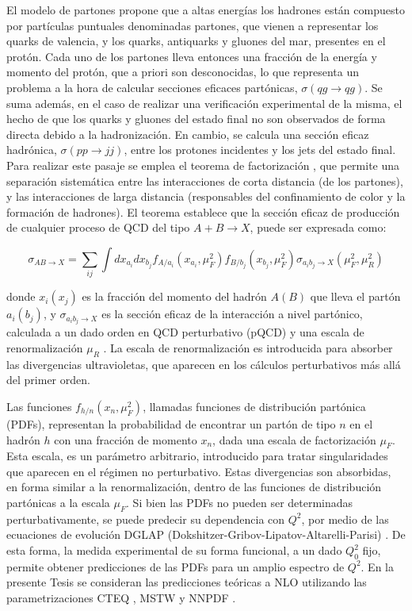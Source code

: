 El modelo de partones propone que a altas energías los hadrones están compuesto por partículas puntuales denominadas partones, que vienen a representar los quarks de valencia, y los quarks, antiquarks y gluones del mar, presentes en el protón. Cada uno de los partones lleva entonces una fracción de la energía y momento del protón, que a priori son desconocidas, lo que representa un problema a la hora de calcular secciones eficaces partónicas, $\sigma(qg\to qg)$.
Se suma además, en el caso de realizar una verificación experimental de la misma, el hecho de que los quarks y gluones del estado final no son observados de forma directa debido a la hadronización. En cambio, se calcula una sección eficaz hadrónica, $\sigma(pp\to jj)$, entre los protones incidentes y los jets del estado final. Para realizar este pasaje se emplea el teorema de factorización \cite{ELLIS1978281}, que permite una separación sistemática
entre las interacciones de corta distancia (de los partones), y las interacciones de larga distancia (responsables del confinamiento de color y la formación de hadrones). El teorema establece que la sección eficaz de producción de cualquier proceso de QCD del tipo $A+B\to X$, puede ser expresada como:


\begin{equation}
	\sigma_{AB\to X} = \sum_{ij} \int dx_{a_i} dx_{b_j} f_{A/a_i}(x_{a_i}, \mu_{F}^2) f_{B/b_j}(x_{b_j}, \mu_{F}^2) \sigma_{a_i b_j \to X}(\mu_{F}^2, \mu_{R}^2)
	\label{eq:xs_fact}
\end{equation}

\noindent
donde $x_i(x_j)$ es la fracción del momento del hadrón $A(B)$ que lleva el partón $a_i(b_j)$, y $\sigma_{a_i b_j \to X}$ es la sección eficaz de la interacción a nivel partónico, calculada a un dado orden en QCD perturbativo (pQCD) y una escala de renormalización $\mu_R$ \cite{tesis_martin}. La escala de renormalización es introducida
para absorber las divergencias ultravioletas, que aparecen en los cálculos perturbativos más
allá del primer orden.

Las funciones $f_{h/n}(x_{n}, \mu_{F}^2)$, llamadas funciones de distribución partónica (PDFs), representan la probabilidad de encontrar un partón de tipo $n$ en el hadrón $h$ con una fracción de
momento $x_n$, dada una escala de factorización $\mu_{F}$. Esta escala, es un parámetro arbitrario,
introducido para tratar singularidades que aparecen en el régimen no perturbativo. Estas
divergencias son absorbidas, en forma similar a la renormalización, dentro de las funciones
de distribución partónicas a la escala $\mu_F$. Si bien las PDFs no pueden ser determinadas
perturbativamente, se puede predecir su dependencia con $Q^2$, por medio de las ecuaciones
de evolución DGLAP (Dokshitzer-Gribov-Lipatov-Altarelli-Parisi) \cite{di_scattering,lipatov_parton,altarelli-parisi}. De esta forma, la
medida experimental de su forma funcional, a un dado $Q^2_0$ fijo, permite obtener predicciones
de las PDFs para un amplio espectro de $Q^2$. En la presente Tesis se consideran las predicciones teóricas a NLO utilizando las parametrizaciones CTEQ \cite{cteq}, MSTW \cite{mstw1, mstw2, mstw3} y NNPDF \cite{nnpdf}.

